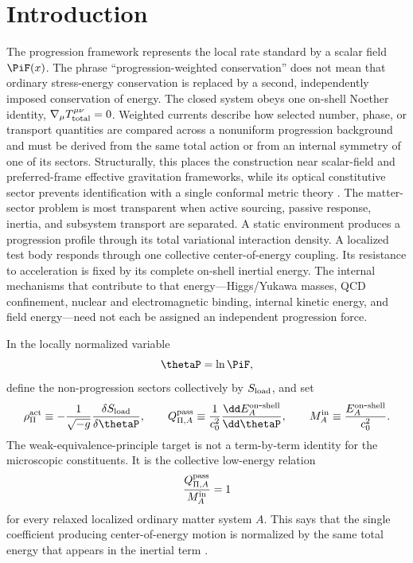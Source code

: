 \documentclass[12pt]{article}
\begin{document}
\section{Introduction}

The progression framework represents the local rate standard by a scalar field \(\PiF(x)\).  The phrase ``progression-weighted conservation'' does not mean that ordinary stress-energy conservation is replaced by a second, independently imposed conservation of energy.  The closed system obeys one on-shell Noether identity, \(\nabla_\mu T_{\rm total}^{\mu\nu}=0\).  Weighted currents describe how selected number, phase, or transport quantities are compared across a nonuniform progression background and must be derived from the same total action or from an internal symmetry of one of its sectors.  Structurally, this places the construction near scalar-field and preferred-frame effective gravitation frameworks, while its optical constitutive sector prevents identification with a single conformal metric theory \cite{BransDicke1961,Bekenstein2004,JacobsonMattingly2001}.  The matter-sector problem is most transparent when active sourcing, passive response, inertia, and subsystem transport are separated.  A static environment produces a progression profile through its total variational interaction density.  A localized test body responds through one collective center-of-energy coupling.  Its resistance to acceleration is fixed by its complete on-shell inertial energy.  The internal mechanisms that contribute to that energy---Higgs/Yukawa masses, QCD confinement, nuclear and electromagnetic binding, internal kinetic energy, and field energy---need not each be assigned an independent progression force.

In the locally normalized variable
\begin{equation}
    \thetaP=\ln\PiF,
\end{equation}
define the non-progression sectors collectively by \(S_{\rm load}\), and set
\begin{equation}
    \rho_\Pi^{\rm act}\equiv
    -\frac{1}{\sqrt{-g}}\frac{\delta S_{\rm load}}{\delta\thetaP},
    \qquad
    Q_{\Pi,A}^{\rm pass}\equiv
    \frac{1}{c_0^2}\frac{\dd E_A^{\rm on\mbox{-}shell}}{\dd\thetaP},
    \qquad
    M_A^{\rm in}\equiv\frac{E_A^{\rm on\mbox{-}shell}}{c_0^2}.
    \label{eq:intro-three-roles}
\end{equation}
The weak-equivalence-principle target is not a term-by-term identity for the microscopic constituents.  It is the collective low-energy relation
\begin{equation}
    \frac{Q_{\Pi,A}^{\rm pass}}{M_A^{\rm in}}=1
    \label{eq:intro-collective-WEP}
\end{equation}
for every relaxed localized ordinary matter system \(A\).  This says that the single coefficient producing center-of-energy motion is normalized by the same total energy that appears in the inertial term \cite{Will2014,Schiff1960}.
\end{document}
